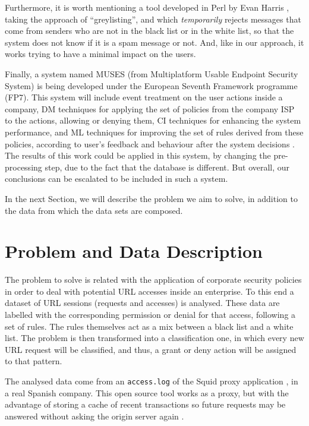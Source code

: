 \documentclass{llncs}
\begin{document}
Furthermore, it is worth mentioning a tool developed in Perl by Evan
Harris \cite{harris2003next}, taking the approach of ``greylisting'',
and which \textit{temporarily} rejects messages that come from senders
who are not in the black list or in the white list, so that the system
does not know if it is a spam message or not. And, like in our
approach, it works trying to have a minimal impact on the users. 

Finally, a system named MUSES (from Multiplatform Usable Endpoint
Security System) \cite{MUSES_SAC_14} is being developed under the
European Seventh Framework  programme (FP7). This system will include
event treatment on the user actions inside a company, DM techniques
for applying the set of policies from the company ISP to the actions,
allowing or denying them, CI techniques for enhancing the system
performance, and ML techniques for improving the set of rules derived
from these policies, according to user's feedback and behaviour after
the system decisions \cite{muses_sotics_13}. The results of this work
could be applied in this system, by changing the pre-processing step,
due to the fact that the database is different. But overall, our
conclusions can be escalated to be included in such a system.    

In the next Section, we will describe the problem we aim to solve, in addition to the data from which the data sets are composed.

%

\section{Problem and Data Description}
\label{sec:problemDescription}

\noindent The problem to solve is related with the application of corporate security policies in order to deal with potential URL accesses inside an enterprise. To this end a dataset of URL sessions (requests and accesses) is analysed. These data are labelled with the corresponding permission or denial for that access, following a set of rules. The rules themselves act as a mix between a black list and a white list. The problem is then transformed into a classification one, in which every new URL request will be classified, and thus, a grant or deny action will be assigned to that pattern.

The analysed data come from an \texttt{access.log} of the Squid proxy application \cite{squid:site}, in a real Spanish company. This open source tool works as a proxy, but with the advantage of storing a cache of recent transactions so future requests may be answered without asking the origin server again \cite{DuaneWessels2004}.  
\end{document}
